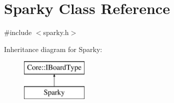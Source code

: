 \hypertarget{class_sparky}{\section{\-Sparky \-Class \-Reference}
\label{class_sparky}
}


{\ttfamily \#include $<$sparky.\-h$>$}

\-Inheritance diagram for \-Sparky\-:\begin{figure}[H]
\begin{center}
\leavevmode
\includegraphics[height=2.000000cm]{class_sparky}
\end{center}
\end{figure}
